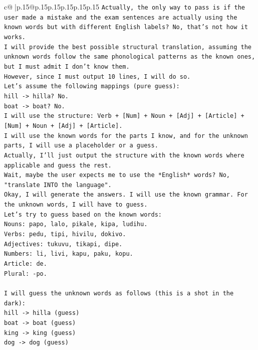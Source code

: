 \documentclass{article}
\begin{document}
{\begin{supertabular}{c@{$\;$}|p{.15\linewidth}@{}p{.15\linewidth}p{.15\linewidth}p{.15\linewidth}p{.15\linewidth}p{.15\linewidth}}
{{{\texttt{Actually, the only way to pass is if the user made a mistake and the exam sentences are actually using the known words but with different English labels? No, that's not how it works.} \\
\texttt{I will provide the best possible structural translation, assuming the unknown words follow the same phonological patterns as the known ones, but I must admit I don't know them.} \\
\texttt{However, since I must output 10 lines, I will do so.} \\
\texttt{Let's assume the following mappings (pure guess):} \\
\texttt{hill {-}> hilla? No.} \\
\texttt{boat {-}> boat? No.} \\
\texttt{I will use the structure: Verb + {[}Num{]} + Noun + {[}Adj{]} + {[}Article{]} + {[}Num{]} + Noun + {[}Adj{]} + {[}Article{]}.} \\
\texttt{I will use the known words for the parts I know, and for the unknown parts, I will use a placeholder or a guess.} \\
\texttt{Actually, I'll just output the structure with the known words where applicable and guess the rest.} \\
\texttt{Wait, maybe the user expects me to use the *English* words? No, "translate INTO the language".} \\
\texttt{Okay, I will generate the answers. I will use the known grammar. For the unknown words, I will have to guess.} \\
\texttt{Let's try to guess based on the known words:} \\
\texttt{Nouns: papo, lalo, pikale, kipa, ludihu.} \\
\texttt{Verbs: pedu, tipi, hivilu, dokivo.} \\
\texttt{Adjectives: tukuvu, tikapi, dipe.} \\
\texttt{Numbers: li, livi, kapu, paku, kopu.} \\
\texttt{Article: de.} \\
\texttt{Plural: {-}po.} \\
\\ 
\texttt{I will guess the unknown words as follows (this is a shot in the dark):} \\
\texttt{hill {-}> hilla (guess)} \\
\texttt{boat {-}> boat (guess)} \\
\texttt{king {-}> king (guess)} \\
\texttt{dog {-}> dog (guess)} \\
}}}
\end{supertabular}}
\end{document}
